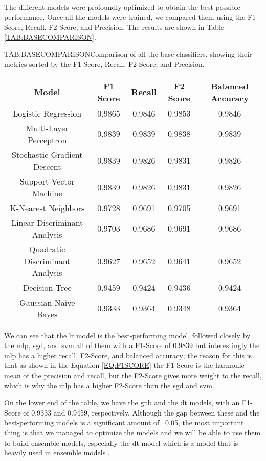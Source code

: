 The different models were profoundly optimized to obtain the best possible performance. Once all the models were trained, we compared them using the F1-Score, Recall, F2-Score, and Precision. The results are shown in Table \ref{TAB:BASECOMPARISON}.

\begin{table}[Base Classifiers Comparison]{TAB:BASECOMPARISON}{Comparison of all the base classifiers, showing their metrics sorted by the F1-Score, Recall, F2-Score, and Precision.}
    \small
    \begin{tabular}{|c|c|c|c|c|}
        \hline
        \textbf{Model} & \textbf{F1 Score} & \textbf{Recall} & \textbf{F2 Score} & \textbf{Balanced Accuracy} \\
        \hline
        Logistic Regression           & 0.9865 & 0.9846 & 0.9853 & 0.9846 \\
        Multi-Layer Perceptron        & 0.9839 & 0.9839 & 0.9838 & 0.9839 \\
        Stochastic Gradient Descent   & 0.9839 & 0.9826 & 0.9831 & 0.9826 \\
        Support Vector Machine        & 0.9839 & 0.9826 & 0.9831 & 0.9826 \\
        K-Nearest Neighbors           & 0.9728 & 0.9691 & 0.9705 & 0.9691 \\
        Linear Discriminant Analysis  & 0.9703 & 0.9686 & 0.9691 & 0.9686 \\
        Quadratic Discriminant Analysis & 0.9627 & 0.9652 & 0.9641 & 0.9652 \\
        Decision Tree                 & 0.9459 & 0.9424 & 0.9436 & 0.9424 \\
        Gaussian Naive Bayes          & 0.9333 & 0.9364 & 0.9348 & 0.9364 \\
        \hline
    \end{tabular}
\end{table}

We can see that the \acl{lr} model is the best-performing model, followed closely by the \acl{mlp}, \acl{sgd}, and \acl{svm} all of them with a F1-Score of 0.9839 but interestingly the \ac{mlp} has a higher recall, F2-Score, and balanced accuracy; the reason for this is that as shown in the Equation \ref{EQ:F1SCORE} the F1-Score is the harmonic mean of the precision and recall, but the F2-Score gives more weight to the recall, which is why the \ac{mlp} has a higher F2-Score than the \ac{sgd} and \ac{svm}.

On the lower end of the table, we have the \ac{gnb} and the \ac{dt} models, with an F1-Score of 0.9333 and 0.9459, respectively. Although the gap between these and the best-performing models is a significant amount of ~0.05, the most important thing is that we managed to optimize the models and we will be able to use them to build ensemble models, especially the \ac{dt} model which is a model that is heavily used in ensemble models \cite{banfield_comparison_2007}.